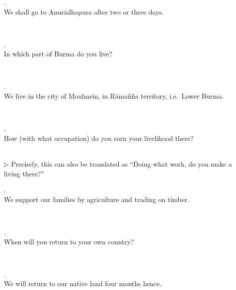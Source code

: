 \medskip
\parbox[lt]{0.93\linewidth}{\raggedright{}. \\
\hspace*{6mm}We shall go to Anur\=adhapura after two or three days.}\\[1mm]

\medskip
\parbox[lt]{0.93\linewidth}{\raggedright{}. \\
\hspace*{6mm}In which part of Burma do you live?}\\[1mm]

\medskip
\parbox[lt]{0.93\linewidth}{\raggedright{}. \\
\hspace*{6mm}We live in the city of Moulmein, in R\=ama\~n\~na territory, i.e.\ Lower Burma.}\\[1mm]

\medskip
\parbox[lt]{0.93\linewidth}{\raggedright{}. \\
\hspace*{6mm}How (with what occupation) do you earn your livelihood there?}\\[1mm]
{\small $\triangleright$ Precisely, this can also be translated as ``Doing what work, do you make a living there?''}

\medskip
\parbox[lt]{0.93\linewidth}{\raggedright{}. \\
\hspace*{6mm}We support our families by agriculture and trading on timber.}\\[1mm]

\medskip
\parbox[lt]{0.93\linewidth}{\raggedright{}. \\
\hspace*{6mm}When will you return to your own country?}\\[1mm]

\medskip
\parbox[lt]{0.93\linewidth}{\raggedright{}. \\
\hspace*{6mm}We will return to our native land four months hence.}\\[1mm]

